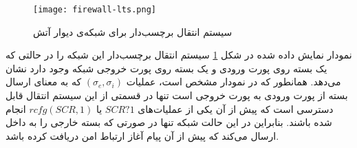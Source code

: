 \begin{figure}[ht]
    \centerline{\texttt{[image: firewall-lts.png]}}
    \caption{سیستم انتقال برچسب‌دار برای شبکه‌ی دیوار آتش
    \cite{dynetkat}
    }
    \label{fig:dynetkat:lts}
\end{figure}
نمودار نمایش داده شده در شکل
\ref{fig:dynetkat:lts}
سیستم انتقال برچسب‌دار%
این شبکه‌ را در حالتی که یک بسته روی پورت ورودی و یک بسته روی پورت خروجی شبکه وجود دارد نشان می‌دهد.
همانطور که در نمودار مشخص است، عملیات
$(\sigma_e,\sigma_i)$
که به معنای ارسال بسته از پورت ورودی به پورت خروجی است تنها در قسمتی از این سیستم انتقال قابل دسترسی است که پیش از آن یکی از عملیات‌های
$SCR?1$
یا
$rcfg(SCR,1)$
انجام شده باشند.
بنابراین در این حالت شبکه تنها در صورتی که بسته خارجی را به داخل ارسال می‌کند که پیش از آن پیام آغاز ارتباط امن دریافت کرده‌ باشد.
